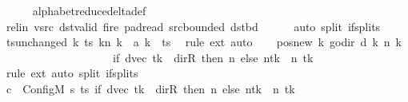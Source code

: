 \begin{isabellebody}
\ \ \ \ \isamarkupfalse%
\ alphabet{\isacharunderscore}{\kern0pt}reduce{\isacharunderscore}{\kern0pt}delta{\isacharunderscore}{\kern0pt}def\isanewline
\ \ \ \ \isamarkupfalse%
\ rel{\isacharunderscore}{\kern0pt}in\ vsrc\ dst{\isacharunderscore}{\kern0pt}valid\ fire{\isacharprime}{\kern0pt}\ pad{\isacharunderscore}{\kern0pt}read\ src{\isacharunderscore}{\kern0pt}bounded\ dst{\isacharunderscore}{\kern0pt}bd\isanewline
\ \ \ \ \isamarkupfalse%
\ {\isacharparenleft}{\kern0pt}auto\ split{\isacharcolon}{\kern0pt}\ if{\isacharunderscore}{\kern0pt}splits{\isacharparenright}{\kern0pt}\isanewline
\ \ \isamarkupfalse%
\ ts{\isacharunderscore}{\kern0pt}unchanged{\isacharcolon}{\kern0pt}\ {\isachardoublequoteopen}{\isacharparenleft}{\kern0pt}{\isasymlambda}k{\isachardot}{\kern0pt}\ {\isacharparenleft}{\kern0pt}ts\ k{\isacharparenright}{\kern0pt}{\isacharparenleft}{\kern0pt}n\ k\ {\isacharcolon}{\kern0pt}{\isacharequal}{\kern0pt}\ {\isacharquery}{\kern0pt}a\ k{\isacharparenright}{\kern0pt}{\isacharparenright}{\kern0pt}\ {\isacharequal}{\kern0pt}\ ts{\isachardoublequoteclose}\ \isamarkupfalse%
\ {\isacharparenleft}{\kern0pt}rule\ ext{\isacharparenright}{\kern0pt}\ auto\isanewline
\ \ \isamarkupfalse%
\ pos{\isacharunderscore}{\kern0pt}new{\isacharcolon}{\kern0pt}\ {\isachardoublequoteopen}{\isacharparenleft}{\kern0pt}{\isasymlambda}k{\isachardot}{\kern0pt}\ go{\isacharunderscore}{\kern0pt}dir\ {\isacharparenleft}{\kern0pt}{\isacharquery}{\kern0pt}d\ k{\isacharparenright}{\kern0pt}\ {\isacharparenleft}{\kern0pt}n\ k{\isacharparenright}{\kern0pt}{\isacharparenright}{\kern0pt}\isanewline
\ \ \ \ \ \ \ \ \ \ \ \ \ \ \ \ \ \ \ {\isacharequal}{\kern0pt}\ {\isacharparenleft}{\kern0pt}if\ dvec\ tk\ {\isacharequal}{\kern0pt}\ dir{\isachardot}{\kern0pt}R\ then\ n\ else\ n{\isacharparenleft}{\kern0pt}tk\ {\isacharcolon}{\kern0pt}{\isacharequal}{\kern0pt}\ n\ tk\ {\isacharminus}{\kern0pt}\ {}{\isacharparenright}{\kern0pt}{\isacharparenright}{\kern0pt}{\isachardoublequoteclose}\isanewline
\ \ \ \ \isamarkupfalse%
\ {\isacharparenleft}{\kern0pt}rule\ ext{\isacharparenright}{\kern0pt}\ {\isacharparenleft}{\kern0pt}auto\ split{\isacharcolon}{\kern0pt}\ if{\isacharunderscore}{\kern0pt}splits{\isacharparenright}{\kern0pt}\isanewline
\ \ \isamarkupfalse%
\ {\isacharquery}{\kern0pt}c{\isacharprime}{\kern0pt}{\isacharprime}{\kern0pt}\ {\isacharequal}{\kern0pt}\ {\isachardoublequoteopen}Config\isactrlsub M\ {\isacharquery}{\kern0pt}s{\isacharprime}{\kern0pt}\ ts\ {\isacharparenleft}{\kern0pt}if\ dvec\ tk\ {\isacharequal}{\kern0pt}\ dir{\isachardot}{\kern0pt}R\ then\ n\ else\ n{\isacharparenleft}{\kern0pt}tk\ {\isacharcolon}{\kern0pt}{\isacharequal}{\kern0pt}\ n\ tk\ {\isacharminus}{\kern0pt}\ {}{\isacharparenright}{\kern0pt}{\isacharparenright}{\kern0pt}{\isachardoublequoteclose}\isanewline

\end{isabellebody}
